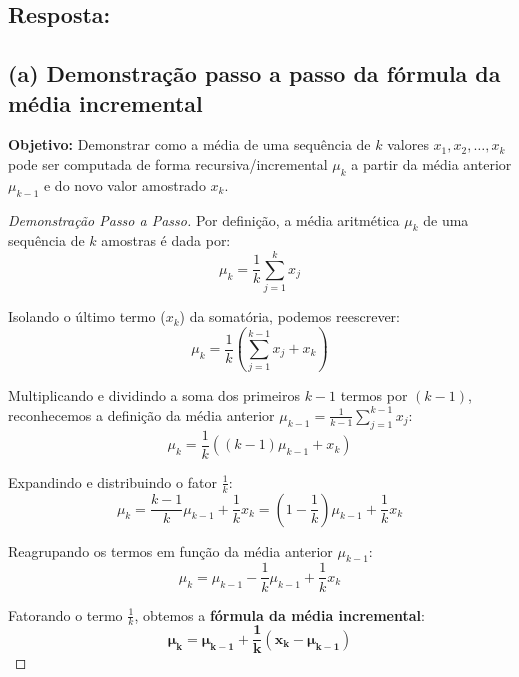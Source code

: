 \documentclass[a4paper,12pt]{article}
\begin{document}
\subsection*{Resposta:}

\bigskip



\subsection*{(a) Demonstração passo a passo da fórmula da média incremental}

\textbf{Objetivo:} Demonstrar como a média de uma sequência de $k$ valores $x_1, x_2, \dots, x_k$ pode ser computada de forma recursiva/incremental $\mu_k$ a partir da média anterior $\mu_{k-1}$ e do novo valor amostrado $x_k$.

\begin{proof}[Demonstração Passo a Passo]
	Por definição, a média aritmética $\mu_k$ de uma sequência de $k$ amostras é dada por:
	\begin{equation}
		\mu_k = \frac{1}{k} \sum_{j=1}^{k} x_j
	\end{equation}
	
	Isolando o último termo ($x_k$) da somatória, podemos reescrever:
	\begin{equation}
		\mu_k = \frac{1}{k} \left( \sum_{j=1}^{k-1} x_j + x_k \right)
	\end{equation}
	
	Multiplicando e dividindo a soma dos primeiros $k-1$ termos por $(k-1)$, reconhecemos a definição da média anterior $\mu_{k-1} = \frac{1}{k-1} \sum_{j=1}^{k-1} x_j$:
	\begin{equation}
		\mu_k = \frac{1}{k} \left( (k-1)\mu_{k-1} + x_k \right)
	\end{equation}
	
	Expandindo e distribuindo o fator $\frac{1}{k}$:
	\begin{equation}
		\mu_k = \frac{k-1}{k} \mu_{k-1} + \frac{1}{k} x_k = \left( 1 - \frac{1}{k} \right) \mu_{k-1} + \frac{1}{k} x_k
	\end{equation}
	
	Reagrupando os termos em função da média anterior $\mu_{k-1}$:
	\begin{equation}
		\mu_k = \mu_{k-1} - \frac{1}{k}\mu_{k-1} + \frac{1}{k}x_k
	\end{equation}
	
	Fatorando o termo $\frac{1}{k}$, obtemos a \textbf{fórmula da média incremental}:
	\begin{equation}
		\mathbf{\mu_k = \mu_{k-1} + \frac{1}{k} \left( x_k - \mu_{k-1} \right)}
	\end{equation}
\end{proof}
\end{document}
